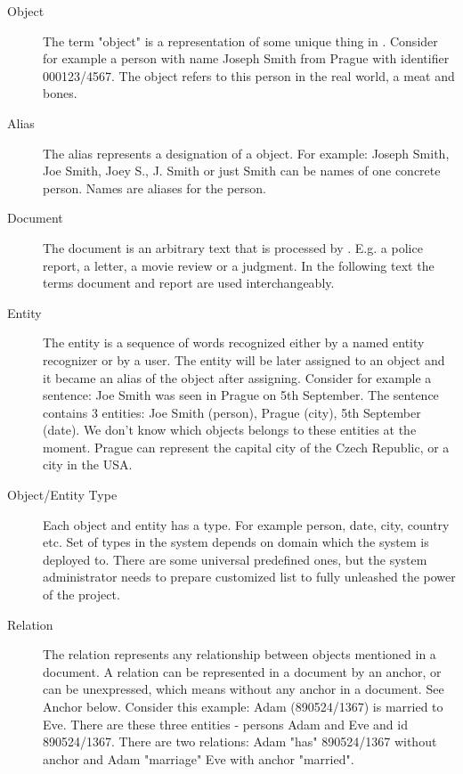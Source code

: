\begin{description}
\item[Object]
The term "object" is a representation of some unique thing in \textan{}. Consider
for example a person with name Joseph Smith from Prague with identifier 000123/4567.
The object refers to this person in the real world, a meat and bones.

\item[Alias]
The alias represents a designation of a object. For example: Joseph Smith, Joe
Smith, Joey S., J. Smith or just Smith can be names of one concrete person.
Names are aliases for the person.


\item[Document]
The document is an arbitrary text that is processed by \textan{}. E.g. a police
report, a letter, a movie review or a judgment. In the following text the terms
document and report are used interchangeably.

\item[Entity]
The entity is a sequence of words recognized either by a named entity recognizer
or by a user. The entity will be later assigned to an object and it became an alias
of the object after assigning. Consider for example a sentence: Joe Smith was seen
in Prague on 5th September. The sentence contains 3 entities: Joe Smith (person),
Prague (city), 5th September (date). We don't know which objects belongs to these
entities at the moment. Prague can represent the capital city of the Czech Republic,
or a city in the USA.

\item[Object/Entity Type]
Each object and entity has a type. For example person, date, city, country etc.
Set of types in the system depends on domain which the system is deployed to.
There are some universal predefined ones, but the system administrator needs to
prepare customized list to fully unleashed the power of the project.

\item[Relation]
The relation represents any relationship between objects mentioned in a document.
A relation can be represented in a document by an anchor, or can be unexpressed,
which means without any anchor in a document. See Anchor below.
Consider this example: Adam (890524/1367) is married to Eve. There are these
three entities - persons Adam and Eve and id 890524/1367. There are two
relations: Adam "has" 890524/1367 without anchor and Adam "marriage" Eve with
anchor "married".


\end{description}
